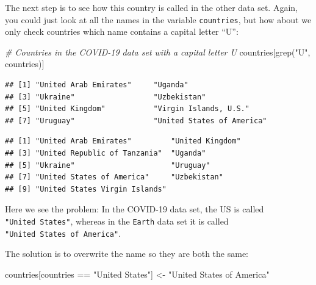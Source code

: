 \documentclass[
]{book}
\newenvironment{Shaded}{\begin{snugshade}}{\end{snugshade}}
\newcommand{\CommentTok}[1]{\textcolor[rgb]{0.56,0.35,0.01}{\textit{#1}}}
\newcommand{\FunctionTok}[1]{\textcolor[rgb]{0.00,0.00,0.00}{#1}}
\newcommand{\NormalTok}[1]{#1}
\newcommand{\OtherTok}[1]{\textcolor[rgb]{0.56,0.35,0.01}{#1}}
\newcommand{\SpecialCharTok}[1]{\textcolor[rgb]{0.00,0.00,0.00}{#1}}
\newcommand{\StringTok}[1]{\textcolor[rgb]{0.31,0.60,0.02}{#1}}
\begin{document}
The next step is to see how this country is called in the other data set. Again, you could just look at all the names in the variable \texttt{countries}, but how about we only check countries which name contains a capital letter ``U'':

\begin{Shaded}
\begin{Highlighting}[]
\CommentTok{\# Countries in the COVID{-}19 data set with a capital letter U}
\NormalTok{countries[}\FunctionTok{grep}\NormalTok{(}\StringTok{"U"}\NormalTok{, countries)]}
\end{Highlighting}
\end{Shaded}

\begin{verbatim}
## [1] "United Arab Emirates"     "Uganda"                  
## [3] "Ukraine"                  "Uzbekistan"              
## [5] "United Kingdom"           "Virgin Islands, U.S."    
## [7] "Uruguay"                  "United States of America"
\end{verbatim}

\begin{Shaded}
\end{Shaded}

\begin{verbatim}
## [1] "United Arab Emirates"         "United Kingdom"              
## [3] "United Republic of Tanzania"  "Uganda"                      
## [5] "Ukraine"                      "Uruguay"                     
## [7] "United States of America"     "Uzbekistan"                  
## [9] "United States Virgin Islands"
\end{verbatim}

Here we see the problem: In the COVID-19 data set, the US is called \texttt{"United\ States"}, whereas in the \texttt{Earth} data set it is called \texttt{"United\ States\ of\ America"}.

The solution is to overwrite the name so they are both the same:

\begin{Shaded}
\begin{Highlighting}[]
\NormalTok{countries[countries }\SpecialCharTok{==} \StringTok{"United States"}\NormalTok{] }\OtherTok{\textless{}{-}} \StringTok{"United States of America"}
\end{Highlighting}
\end{Shaded}
\end{document}
